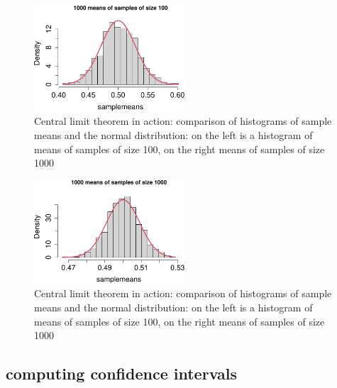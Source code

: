 \documentclass[
  letterpaper,
  DIV=11,
  numbers=noendperiod]{scrreprt}
\begin{document}
\begin{figure}

{\centering \includegraphics[width=0.5\textwidth,height=\textheight]{./sampling_files/figure-pdf/clt-demo-1.pdf}

}

\caption{Central limit theorem in action: comparison of histograms of
sample means and the normal distribution: on the left is a histogram of
means of samples of size 100, on the right means of samples of size
1000}

\end{figure}

\begin{figure}

{\centering \includegraphics[width=0.5\textwidth,height=\textheight]{./sampling_files/figure-pdf/clt-demo-2.pdf}

}

\caption{Central limit theorem in action: comparison of histograms of
sample means and the normal distribution: on the left is a histogram of
means of samples of size 100, on the right means of samples of size
1000}

\end{figure}

\hypertarget{computing-confidence-intervals}{%
\subsection{computing confidence
intervals}\label{computing-confidence-intervals}}
\end{document}
